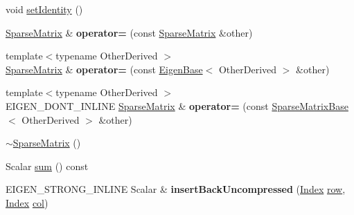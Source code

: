 \begin{DoxyCompactItemize}
\item 
void \mbox{\hyperlink{class_eigen_1_1_sparse_matrix_a89013d2aa58413672c90932607a0d6f0}{set\+Identity}} ()
\item 
\mbox{\label{class_eigen_1_1_sparse_matrix_a241af782636f279406f4860fe49252b0}} 
\mbox{\hyperlink{class_eigen_1_1_sparse_matrix}{Sparse\+Matrix}} \& {\bfseries operator=} (const \mbox{\hyperlink{class_eigen_1_1_sparse_matrix}{Sparse\+Matrix}} \&other)
\item 
\mbox{\label{class_eigen_1_1_sparse_matrix_a3e4ba9ae100c0aa200312d57921ebe3d}} 
{\footnotesize template$<$typename Other\+Derived $>$ }\\\mbox{\hyperlink{class_eigen_1_1_sparse_matrix}{Sparse\+Matrix}} \& {\bfseries operator=} (const \mbox{\hyperlink{struct_eigen_1_1_eigen_base}{Eigen\+Base}}$<$ Other\+Derived $>$ \&other)
\item 
\mbox{\label{class_eigen_1_1_sparse_matrix_a16f034fe9fdb1fc8caae7c6bba846388}} 
{\footnotesize template$<$typename Other\+Derived $>$ }\\E\+I\+G\+E\+N\+\_\+\+D\+O\+N\+T\+\_\+\+I\+N\+L\+I\+NE \mbox{\hyperlink{class_eigen_1_1_sparse_matrix}{Sparse\+Matrix}} \& {\bfseries operator=} (const \mbox{\hyperlink{class_eigen_1_1_sparse_matrix_base}{Sparse\+Matrix\+Base}}$<$ Other\+Derived $>$ \&other)
\item 
\mbox{\hyperlink{class_eigen_1_1_sparse_matrix_a36835ee4f8e5f273087910ec8063a4f6}{$\sim$\+Sparse\+Matrix}} ()
\item 
Scalar \mbox{\hyperlink{class_eigen_1_1_sparse_matrix_a0700cd0b8658962d742fa51a5e594a2f}{sum}} () const
\item 
\mbox{\label{class_eigen_1_1_sparse_matrix_a3ce16a1f1473b099d840c6e6c4a1a9e3}} 
E\+I\+G\+E\+N\+\_\+\+S\+T\+R\+O\+N\+G\+\_\+\+I\+N\+L\+I\+NE Scalar \& {\bfseries insert\+Back\+Uncompressed} (\mbox{\hyperlink{struct_eigen_1_1_eigen_base_a554f30542cc2316add4b1ea0a492ff02}{Index}} \mbox{\hyperlink{class_eigen_1_1_sparse_matrix_base_ac0a5563ed3f243f013fb9d2c17e230d0}{row}}, \mbox{\hyperlink{struct_eigen_1_1_eigen_base_a554f30542cc2316add4b1ea0a492ff02}{Index}} \mbox{\hyperlink{class_eigen_1_1_sparse_matrix_base_a8f4eaa3c3921ef3823ffc69ebcc356af}{col}})
\item 

\end{DoxyCompactItemize}
